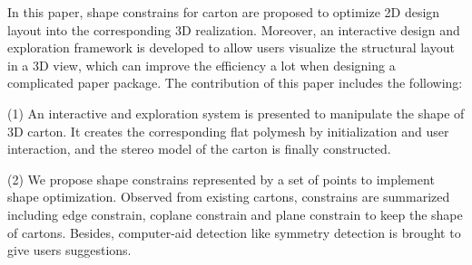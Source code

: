 {\color{blue}{Given a structural layout of a carton only, it is hard to formulate the final state of model mathematically cause the information extracted from layout is little and even the topology is changing after merging vertexes that need to relocate in the same place. However it is also important to
construct 3D models from layout, on one hand, the layouts of cartons are more reachable for common users, on the other hand, the unfolded layouts from 3D objects consume more paper and sometimes are not feasible to fold.}}


In this paper, shape constrains for carton are proposed to optimize 2D design layout into the corresponding 3D realization. Moreover, an interactive design and exploration framework is developed to allow users visualize the structural layout in a 3D view, which can improve the efficiency a lot when designing a complicated paper package. The contribution of this paper includes the following:

(1) An interactive and exploration system is presented to manipulate the shape of 3D carton. It creates the corresponding flat polymesh by initialization and user interaction, and the stereo model of the carton is finally constructed.

(2) We propose shape constrains represented by a set of points to implement shape optimization. Observed from existing cartons,  constrains are summarized including edge constrain, coplane constrain and plane constrain to keep the shape of cartons. Besides, computer-aid detection like symmetry detection is brought to give users suggestions. 
